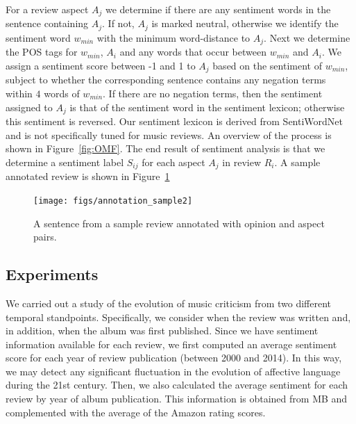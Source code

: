 For a review aspect $A_{j}$ we determine if there are any sentiment words in the sentence containing $A_{j}$. If not, $A_{j}$ is marked neutral, otherwise we identify the sentiment word $w_{min}$ with the minimum word-distance to $A_j$. Next we determine the POS tags for $w_{min}$, $A_i$ and any words that occur between $w_{min}$ and $A_i$. 
We assign a sentiment score between -1 and 1 to $A_j$ based on the sentiment of $w_{min}$, subject to whether the corresponding sentence contains any negation terms within $4$ words of $w_{min}$. If there are no negation terms, then the sentiment assigned to $A_j$ is that of the sentiment word in the sentiment lexicon; otherwise this sentiment is reversed. Our sentiment lexicon is derived from SentiWordNet \cite{esuli2006sentiwordnet} and is not specifically tuned for music reviews.
An overview of the process is shown in Figure~\ref{fig:OMF}. The end result of sentiment analysis is that we determine a sentiment label $S_{ij}$ for each aspect $A_j$ in review $R_i$. A sample annotated review is shown in Figure~\ref{fig:annotatedreview}
\begin{figure}[h]
\texttt{[image: figs/annotation\_sample2]}
\caption{A sentence from a sample review annotated with opinion and aspect pairs.}
\label{fig:annotatedreview}
\end{figure}



\subsection{Experiments}

We carried out a study of the evolution of music criticism from two different temporal standpoints. Specifically, we consider when the review was written and, in addition, when the album was first published. Since we have sentiment information available for each review, we first computed an average sentiment score for each year of review publication (between 2000 and 2014). In this way, we may detect any significant fluctuation in the evolution of affective language during the 21st century. Then, we also calculated the average sentiment for each review by year of album publication. This information is obtained from MB and complemented with the average of the Amazon rating scores.

